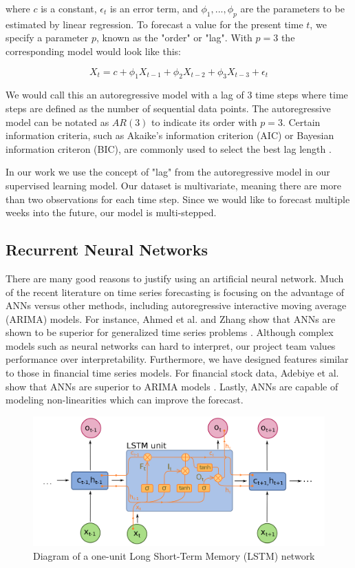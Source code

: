 \documentclass[11pt, oneside, authoryear]{report}
\begin{document}
where $c$ is a constant, $\epsilon_t$ is an error term, and $\phi_1, ..., \phi_p$ are the parameters to be estimated by linear regression. To forecast a value for the present time $t$, we specify a parameter $p$, known as the "order" or "lag". With $p=3$ the corresponding model would look like this:

\begin{equation}
  \label{eq:2}
  X_t = c + \phi_1 X_{t-1} + \phi_2 X_{t-2} + \phi_3 X_{t-3} + \epsilon_t
\end{equation}

We would call this an autoregressive model with a lag of 3 time steps where time steps are defined as the number of sequential data points. The autoregressive model can be notated as $AR(3)$ to indicate its order with $p=3$. Certain information criteria, such as Akaike's information criterion (AIC) or Bayesian information criteron (BIC), are commonly used to select the best lag length \citep{liew}.

In our work we use the concept of "lag" from the autoregressive model in our supervised learning model. Our dataset is multivariate, meaning there are more than two observations for each time step. Since we would like to forecast multiple weeks into the future, our model is multi-stepped.

\subsection{Recurrent Neural Networks}

There are many good reasons to justify using an artificial neural network. Much of the recent literature on time series forecasting is focusing on the advantage of ANNs versus other methods, including autoregressive interactive moving average (ARIMA) models. For instance, Ahmed et al. and Zhang show that ANNs are shown to be superior for generalized time series problems \citep{ahmed}. Although complex models such as neural networks can hard to interpret, our project team values performance over interpretability. Furthermore, we have designed features similar to those in financial time series models. For financial stock data, Adebiye et al. show that ANNs are superior to ARIMA models \citep{adebiye}. Lastly, ANNs are capable of modeling non-linearities which can improve the forecast.

\begin{figure}[h]
  \caption{Diagram of a one-unit Long Short-Term Memory (LSTM) network \citep{deloche}}
  \centering
  \includegraphics[width=12.5cm]{images/Long_Short-Term_Memory.png}
\end{figure}
\end{document}
